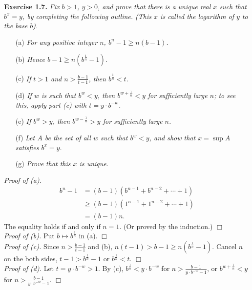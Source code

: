 \documentclass{article}
\begin{document}



\textbf{Exercise 1.7.}
\emph{Fix $b > 1$, $y > 0$, and prove that there is a unique real $x$
such that $b^x = y$, by completing the following outline.
(This $x$ is called the logarithm of $y$ to the base $b$).}
\begin{enumerate}
\item[(a)]
\emph{For any positive integer $n$, $b^n - 1 \geq n(b-1)$.}
\item[(b)]
\emph{Hence $b - 1 \geq n (b^{\frac{1}{n}} - 1)$.}
\item[(c)]
\emph{If $t > 1$ and $n > \frac{b-1}{t-1}$, then $b^{\frac{1}{n}} < t$.}
\item[(d)]
\emph{If $w$ is such that $b^w < y$, then $b^{w + \frac{1}{n}} < y$ for sufficiently large $n$;
to see this, apply part (c) with $t = y \cdot b^{-w}$.}
\item[(e)]
\emph{If $b^w > y$, then $b^{w - \frac{1}{n}} > y$ for sufficiently large $n$.}
\item[(f)]
\emph{Let $A$ be the set of all $w$ such that $b^w < y$, and show that $x = \sup A$
satisfies $b^x = y$.}
\item[(g)]
\emph{Prove that this $x$ is unique.} \\
\end{enumerate}

\emph{Proof of (a).}
\begin{align*}
b^n - 1
&= (b - 1)(b^{n-1} + b^{n-2} + \cdots + 1) \\
&\geq (b - 1)(1^{n-1} + 1^{n-2} + \cdots + 1) \\
&= (b - 1)n.
\end{align*}
The equality holds if and only if $n = 1$.
(Or proved by the induction.)
$\Box$ \\

\emph{Proof of (b).}
Put $b \mapsto b^{\frac{1}{n}}$ in (a).
$\Box$ \\

\emph{Proof of (c).}
Since $n > \frac{b-1}{t-1}$ and (b), $n(t-1) > b-1 \geq n (b^{\frac{1}{n}} - 1)$.
Cancel $n$ on the both sides, $t-1 > b^{\frac{1}{n}} - 1$ or $b^{\frac{1}{n}} < t$.
$\Box$ \\

\emph{Proof of (d).}
Let $t = y \cdot b^{-w} > 1$.
By (c), $b^{\frac{1}{n}} < y \cdot b^{-w}$ for $n > \frac{b-1}{y \cdot b^{-w}-1}$,
or $b^{w + \frac{1}{n}} < y$ for $n > \frac{b-1}{y \cdot b^{-w}-1}$.
$\Box$ \\
\end{document}
